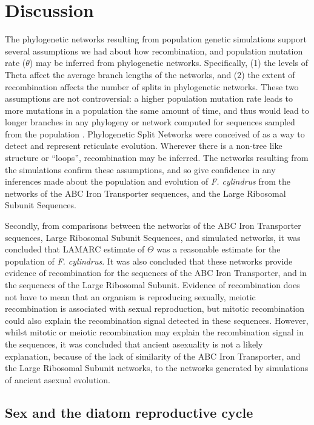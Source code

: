 \section{Discussion}

The phylogenetic networks resulting from population genetic simulations support several assumptions we had about how recombination, and population mutation rate ($\theta$) may be inferred from phylogenetic networks.
Specifically, (1) the levels of Theta affect the average branch lengths of the networks, and (2) the extent of recombination affects the number of splits in phylogenetic networks.
These two assumptions are not controversial: a higher population mutation rate leads to more mutations in a population the same amount of time, and thus would lead to longer branches in any phylogeny or network computed for sequences sampled from the population \parencite{Frankham1996,Hein2004,Wakeley2008}.
Phylogenetic Split Networks \parencite{Huson1998} were conceived of as a way to detect and represent reticulate evolution.
Wherever there is a non-tree like structure or “loops”, recombination may be inferred.
The networks resulting from the simulations confirm these assumptions, and so give confidence in any inferences made about the population and evolution of \textit{F. cylindrus} from the networks of the ABC Iron Transporter sequences, and the Large Ribosomal Subunit Sequences.

Secondly, from comparisons between the networks of the ABC Iron Transporter sequences, Large Ribosomal Subunit Sequences, and simulated networks, it was concluded that LAMARC \parencite{Kuhner2006a} estimate of $\Theta$ was a reasonable estimate for the population of \textit{F. cylindrus}.
It was also concluded that these networks provide evidence of recombination for the sequences of the ABC Iron Transporter, and in the sequences of the Large Ribosomal Subunit.
Evidence of recombination does not have to mean that an organism is reproducing sexually, meiotic recombination is associated with sexual reproduction, but mitotic recombination could also explain the recombination signal detected in these sequences.
However, whilst mitotic or meiotic recombination may explain the recombination signal in the sequences, it was concluded that ancient asexuality is not a likely explanation, because of the lack of similarity of the ABC Iron Transporter, and the Large Ribosomal Subunit networks, to the networks generated by simulations of ancient asexual evolution.


\subsection{Sex and the diatom reproductive cycle}

